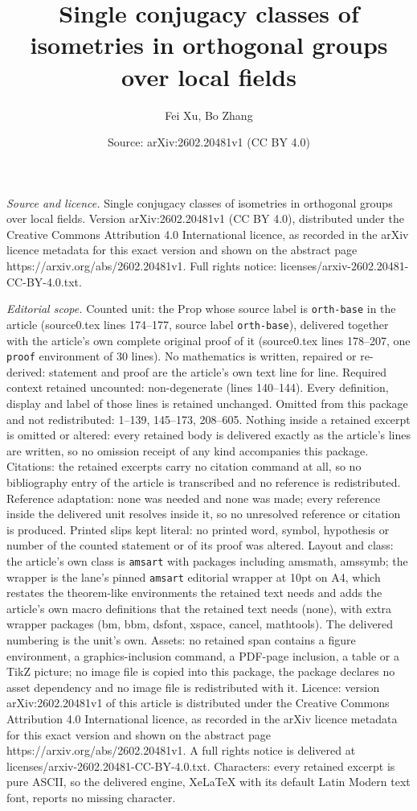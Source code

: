 \documentclass[10pt,a4paper]{amsart}
\title[Single conjugacy classes of isometries in orthogonal groups ]{Single conjugacy classes of isometries in orthogonal groups over local fields}
\author{Fei Xu, Bo Zhang}
\date{Source: arXiv:2602.20481v1 (CC BY 4.0)}
\begin{document}
\maketitle

\noindent\emph{Source and licence.} Single conjugacy classes of isometries in orthogonal groups over local fields. Version arXiv:2602.20481v1 (CC BY 4.0), distributed under the Creative Commons Attribution 4.0 International licence, as recorded in the arXiv licence metadata for this exact version and shown on the abstract page https://arxiv.org/abs/2602.20481v1. Full rights notice: licenses/arxiv-2602.20481-CC-BY-4.0.txt.\par\smallskip

\noindent\textit{Editorial scope.} Counted unit: the Prop whose source label is \texttt{orth-base} in the article (source0.tex lines 174--177, source label \texttt{orth-base}), delivered together with the article's own complete original proof of it (source0.tex lines 178--207, one \texttt{proof} environment of 30 lines). No mathematics is written, repaired or re-derived: statement and proof are the article's own text line for line. Required context retained uncounted: non-degenerate (lines 140--144). Every definition, display and label of those lines is retained unchanged. Omitted from this package and not redistributed: 1--139, 145--173, 208--605. Nothing inside a retained excerpt is omitted or altered: every retained body is delivered exactly as the article's lines are written, so no omission receipt of any kind accompanies this package. Citations: the retained excerpts carry no citation command at all, so no bibliography entry of the article is transcribed and no reference is redistributed. Reference adaptation: none was needed and none was made; every reference inside the delivered unit resolves inside it, so no unresolved reference or citation is produced. Printed slips kept literal: no printed word, symbol, hypothesis or number of the counted statement or of its proof was altered. Layout and class: the article's own class is \texttt{amsart} with packages including amsmath, amssymb; the wrapper is the lane's pinned \texttt{amsart} editorial wrapper at 10pt on A4, which restates the theorem-like environments the retained text needs and adds the article's own macro definitions that the retained text needs (none), with extra wrapper packages (bm, bbm, dsfont, xspace, cancel, mathtools). The delivered numbering is the unit's own. Assets: no retained span contains a figure environment, a graphics-inclusion command, a PDF-page inclusion, a table or a TikZ picture; no image file is copied into this package, the package declares no asset dependency and no image file is redistributed with it. Licence: version arXiv:2602.20481v1 of this article is distributed under the Creative Commons Attribution 4.0 International licence, as recorded in the arXiv licence metadata for this exact version and shown on the abstract page https://arxiv.org/abs/2602.20481v1. A full rights notice is delivered at licenses/arxiv-2602.20481-CC-BY-4.0.txt. Characters: every retained excerpt is pure ASCII, so the delivered engine, XeLaTeX with its default Latin Modern text font, reports no missing character.
\end{document}
